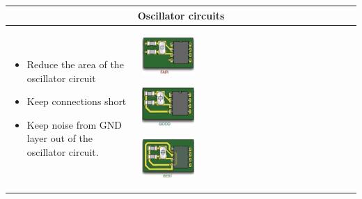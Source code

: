 		\begin{table}[h!]
		\centering
		\begin{tabular}{|m{}|m{}|}
				\multicolumn{2}{c}{\textbf{Oscillator circuits}}
			\\
			\hline
				\begin{itemize}
					\item Reduce the area of the oscillator circuit
					\item Keep connections short
					\item Keep noise from GND layer out of the oscillator circuit. 
				\end{itemize}
			& 
				\begin{center}\includegraphics[width=0.25\textwidth]{images/Oszi1.png}\end{center}  
				\begin{center}\includegraphics[width=0.25\textwidth]{images/Oszi2.png}\end{center} 
				\begin{center}\includegraphics[width=0.25\textwidth]{images/Oszi3.png}\end{center}   
			\\	
			\hline
			\end{tabular}
		\end{table}	
		

